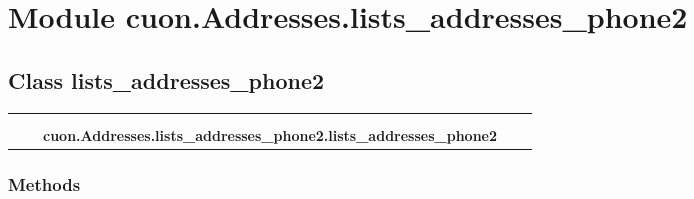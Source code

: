 %
%
%


\section{Module cuon.Addresses.lists\_addresses\_phone2}

    \label{cuon:Addresses:lists_addresses_phone2}


\subsection{Class lists\_addresses\_phone2}

    \label{cuon:Addresses:lists_addresses_phone2:lists_addresses_phone2}
\begin{tabular}{cccccc}
\multicolumn{2}{r}{\settowidth{\BCL}{??-8}\multirow{2}{\BCL}{??-8}}
&&
  \\\cline{3-3}
  &&\multicolumn{1}{c|}{}
&&
  \\
&&\multicolumn{2}{l}{\textbf{cuon.Addresses.lists\_addresses\_phone2.lists\_addresses\_phone2}}
\end{tabular}



  \subsubsection{Methods}

